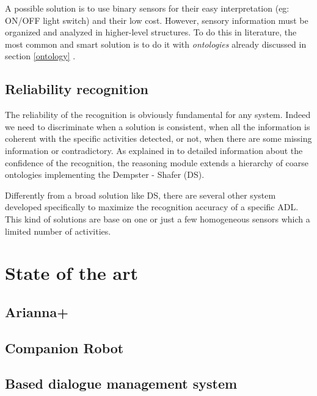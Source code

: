 \documentclass{thesisreport}
\begin{document}
A possible solution is to use binary sensors for their easy interpretation (eg: ON/OFF light switch) and their low cost. However, sensory information must be organized and analyzed in higher-level structures. To do this in literature, the most common and smart solution is to do it with \textit{ontologies}  already discussed in section \ref{ontology} \cite{buoncompagni2017towards}.

\section{Reliability recognition}
The reliability of the recognition is obviously fundamental for any system. Indeed we need to discriminate when a solution is consistent, when all the information is coherent with the specific activities detected, or not, when there are some missing information or contradictory.
As explained in \cite{sentz2002combination} to detailed information about the confidence of the recognition, the reasoning module extends a hierarchy of coarse ontologies implementing the Dempster - Shafer (DS). 

Differently from a broad solution like DS, there are several other system developed specifically to maximize the recognition accuracy of a specific ADL. This kind of solutions are base on one or just a few homogeneous sensors which a limited number of activities.  

 \chapter{State of the art}
 
 \section{Arianna+} \label{Arianna}
 
 \section{Companion Robot}  \label{companionRobot}
 
 \section{Based dialogue management system} \label{speech}

  
\end{document}
